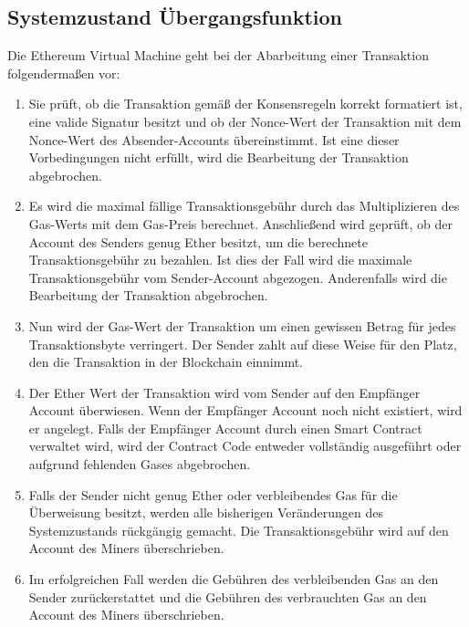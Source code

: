 \subsection{Systemzustand Übergangsfunktion}
Die Ethereum Virtual Machine geht bei der Abarbeitung einer Transaktion folgendermaßen vor:
\begin{enumerate}
\item Sie prüft, ob die Transaktion gemäß der Konsensregeln korrekt formatiert ist, eine valide Signatur besitzt und ob der Nonce-Wert der Transaktion mit dem Nonce-Wert des Absender-Accounts übereinstimmt. Ist eine dieser Vorbedingungen nicht erfüllt, wird die Bearbeitung der Transaktion abgebrochen. \newpage
\item Es wird die maximal fällige Transaktionsgebühr durch das Multiplizieren des Gas-Werts mit dem Gas-Preis berechnet. Anschließend wird geprüft, ob der Account des Senders genug Ether besitzt, um die berechnete Transaktionsgebühr zu bezahlen. Ist dies der Fall wird die maximale Transaktionsgebühr vom Sender-Account abgezogen. Anderenfalls wird die Bearbeitung der Transaktion abgebrochen. 
\item Nun wird der Gas-Wert der Transaktion um einen gewissen Betrag für jedes Transaktionsbyte verringert. Der Sender zahlt auf diese Weise für den Platz, den die Transaktion in der Blockchain einnimmt.
\item Der Ether Wert der Transaktion wird vom Sender auf den Empfänger Account überwiesen. Wenn der Empfänger Account noch nicht existiert, wird er angelegt. Falls der Empfänger Account durch einen Smart Contract verwaltet wird, wird der Contract Code entweder vollständig ausgeführt oder aufgrund fehlenden Gases abgebrochen. 
\item Falls der Sender nicht genug Ether oder verbleibendes Gas für die Überweisung besitzt, werden alle bisherigen Veränderungen des Systemzustands rückgängig gemacht. Die Transaktionsgebühr wird auf den Account des Miners überschrieben.
\item Im erfolgreichen Fall werden die Gebühren des verbleibenden Gas an den Sender zurückerstattet und die Gebühren des verbrauchten Gas an den Account des Miners überschrieben.
\end{enumerate}

